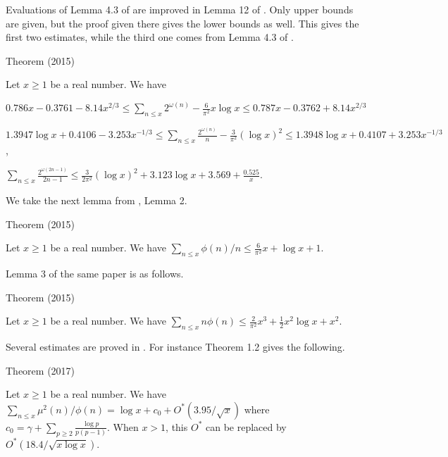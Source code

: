Evaluations of Lemma 4.3  of
\cite{Cipu*15-1}
are improved in Lemma 12 of
\cite{Trudgian*15-2}.
Only upper bounds are given, but the proof given there gives the lower
bounds as well. This gives the first two estimates, while the third
one comes from 
Lemma 4.3  of
\cite{Cipu*15-1}.

\begin{thm}{Theorem (2015)}

  Let $x\ge1$ be a real number. We have
  
 
  $\displaystyle 0.786x-0.3761-8.14x^{2/3}
  \le \sum_{n\le x}2^{\omega(n)}-\frac{6}{\pi^2}x\log x
    \le 0.787x-0.3762+8.14x^{2/3}$
 
 $\displaystyle 1.3947\log x+0.4106-3.253x^{-1/3}
  \le \sum_{n\le x}\frac{2^{\omega(n)}}{n}-\frac{3}{\pi^2}(\log x)^2
    \le 1.3948\log x+0.4107+3.253x^{-1/3}$,
 
  $\displaystyle \sum_{n\le x}\frac{2^{\omega(2n-1)}}{2n-1}
  \le \frac{3}{2\pi^2}(\log x)^2+3.123\log x+3.569+\frac{0.525}{x}$.

\end{thm}



We take the next lemma from
\cite{Trevino*15-2}, Lemma 2.

\begin{thm}{Theorem (2015)}

  Let $x\ge1$ be a real number. We have
  $\sum_{n\le x}\phi(n)/n\le \frac{6}{\pi^2}x+\log x +1$.
\end{thm}

  

Lemma 3 of the same paper is as follows.

\begin{thm}{Theorem (2015)}

  Let $x\ge1$ be a real number. We have
  $\sum_{n\le x}n\phi(n)\le \frac{2}{\pi^2}x^3+\frac12x^2\log x +x^2$.
\end{thm}


Several estimates are proved in
\cite{Ramare*14-1}.
For instance Theorem 1.2 gives the following.

\begin{thm}{Theorem (2017)}

  Let $x\ge1$ be a real number. We have
  $\sum_{n\le x}\mu^2(n)/\phi(n)= \log x
  +c_0+O^*(3.95/\sqrt{x})$ where $\displaystyle c_0=\gamma+\sum_{p\ge2}\frac{\log
  p}{p(p-1)}$.
  When $x > 1$, this $O^*$ can be replaced
  by $O^*(18.4/\sqrt{x\log x})$. 
\end{thm}

